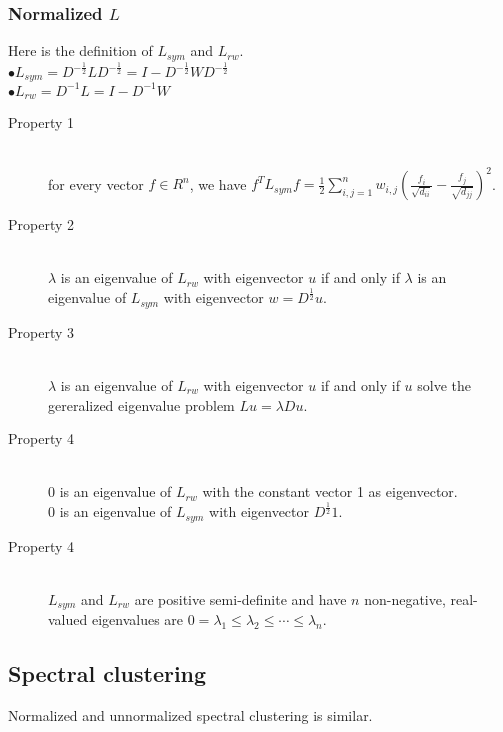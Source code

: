 \subsubsection{Normalized $L$}
Here is the definition of $L_{sym}$ and $L_{rw}$. \\
$\bullet$$L_{sym} = D^{-\frac{1}{2}} L D^{-\frac{1}{2}} = I - D^{-\frac{1}{2}} W D^{-\frac{1}{2}}$ \\
$\bullet$$L_{rw} = D^{-1} L = I - D^{-1} W$

\begin{description}
\item[Property 1] \hfill \\
for every vector $f \in R^n$, we have $f^T L_{sym} f = \frac{1}{2} \sum_{i,j=1}^{n} w_{i,j}(\frac{f_i}{\sqrt{d_{ii}}} - \frac{f_j}{\sqrt{d_{jj}}})^2$.
\item[Property 2] \hfill \\
$\lambda$ is an eigenvalue of $L_{rw}$ with eigenvector $u$ if and only if $\lambda$ is an eigenvalue of $L_{sym}$ with eigenvector $w = D^{\frac{1}{2}} u$.

\item[Property 3] \hfill \\
$\lambda$ is an eigenvalue of $L_{rw}$ with eigenvector $u$ if and only if $u$ solve the gereralized eigenvalue problem $L u = \lambda D u$.

\item[Property 4] \hfill \\
0 is an eigenvalue of $L_{rw}$ with the constant vector 1 as eigenvector.\\
0 is an eigenvalue of $L_{sym}$ with eigenvector $D^{\frac{1}{2}} 1 $.

\item[Property 4] \hfill \\
$L_{sym}$ and $L_{rw}$ are positive semi-definite and have $n$ non-negative, real-valued eigenvalues are $0 = \lambda_1 \leq  \lambda_2 \leq  \cdots \leq  \lambda_n$.
\end{description}

\subsection{Spectral clustering}
Normalized and unnormalized spectral clustering is similar.


